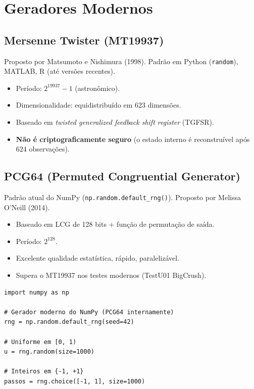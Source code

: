 \documentclass[12pt,a4paper]{article}
\begin{document}
\section{Geradores Modernos}

\subsection{Mersenne Twister (MT19937)}

Proposto por Matsumoto e Nishimura (1998). Padr\~ao em Python (\texttt{random}), MATLAB, R (at\'e vers\~oes recentes).

\begin{itemize}
  \item Per\'iodo: $2^{19937} - 1$ (astronômico).
  \item Dimensionalidade: equidistribuído em 623 dimens\~oes.
  \item Baseado em \emph{twisted generalized feedback shift register} (TGFSR).
  \item \textbf{N\~ao \'e criptograficamente seguro} (o estado interno \'e reconstru\'ivel ap\'os $624$ observa\c{c}\~oes).
\end{itemize}

\subsection{PCG64 (Permuted Congruential Generator)}

Padr\~ao atual do NumPy (\texttt{np.random.default\_rng()}). Proposto por Melissa O'Neill (2014).

\begin{itemize}
  \item Baseado em LCG de 128 bits + fun\c{c}\~ao de permuta\c{c}\~ao de sa\'ida.
  \item Per\'iodo: $2^{128}$.
  \item Excelente qualidade estat\'istica, r\'apido, paraleliz\'avel.
  \item Supera o MT19937 nos testes modernos (TestU01 BigCrush).
\end{itemize}

\begin{lstlisting}
import numpy as np

# Gerador moderno do NumPy (PCG64 internamente)
rng = np.random.default_rng(seed=42)

# Uniforme em [0, 1)
u = rng.random(size=1000)

# Inteiros em {-1, +1}
passos = rng.choice([-1, 1], size=1000)
\end{lstlisting}
\end{document}
